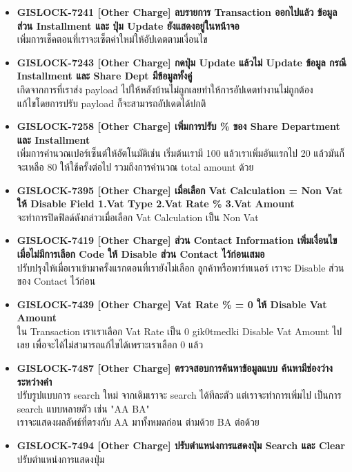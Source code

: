 \begin{itemize}
    \item \textbf{{GISLOCK-7241 [Other Charge] ลบรายการ Transaction ออกไปแล้ว ข้อมูลส่วน Installment และ ปุ่ม Update ยังแสดงอยู่ในหน้าจอ}} \\
        เพิ่มการเช็คตอนที่เราจะเซ็ตค่าใหม่ให้อัปเดตตามเงื่อนไข
    \item \textbf{{GISLOCK-7243 [Other Charge] กดปุ่ม Update แล้วไม่ Update ข้อมูล กรณี Installment และ Share Dept มีข้อมูลทั้งคู่}} \\
        เกิดจากการที่เราส่ง payload ไปให้หลังบ้านไม่ถูกเลยทำให้การอัปเดตทำงานไม่ถูกต้อง \\
        แก้ไขโดยการปรับ payload ก็จะสามารถอัปเดตได้ปกติ
    \item \textbf{{GISLOCK-7258 [Other Charge] เพิ่มการปรับ \% ของ Share Department และ Installment}} \\
        เพิ่มการคำนวณเปอร์เซ็นต์ให้อัตโนมัติเช่น เริ่มต้นเรามี 100 แล้วเราเพิ่มอันแรกไป 20 แล้วมันก็จะเหลือ 80 ให้ใช้ครั้งต่อไป รวมถึงการคำนวณ total amount ด้วย
    \item \textbf{{GISLOCK-7395 [Other Charge] เมื่อเลือก Vat Calculation = Non Vat ให้ Disable Field 1.Vat Type 2.Vat Rate \% 3.Vat Amount}} \\
        จะทำการปิดฟิลด์ดังกล่าวเมื่อเลือก Vat Calculation เป็น Non Vat
    \item \textbf{{GISLOCK-7419 [Other Charge] ส่วน Contact Information เพิ่มเงื่อนไขเมื่อไม่มีการเลือก Code ให้ Disable ส่วน Contact ไว้ก่อนเสมอ}} \\
        ปรับปรุงให้เมื่อเราเข้ามาครั้งแรกตอนที่เรายังไม่เลือก ลูกค้าหรือพาร์ทเนอร์ เราจะ Disable ส่วนของ Contact ไว้ก่อน
    \item \textbf{{GISLOCK-7439 [Other Charge] Vat Rate \% = 0 ให้ Disable Vat Amount}} \\
        ใน Transaction เราเราเลือก Vat Rate เป็น 0 gik0tmedki Disable Vat Amount ไปเลย เพื่อจะได้ไม่สามารถแก้ไขได้เพราะเราเลือก 0 แล้ว 
    \item \textbf{{GISLOCK-7487 [Other Charge] ตรวจสอบการค้นหาข้อมูลแบบ ค้นหามีช่องว่างระหว่างคำ}} \\
        ปรับรูปแบบการ search ใหม่ จากเดิมเราจะ search ได้ทีละตัว แต่เราจะทำการเพิ่มไป เป็นการ search แบบหลายตัว เช่น "AA BA" \\
        เราจะแสดงผลลัพธ์ที่ตรงกับ AA มาทั้งหมดก่อน ต่ามด้วย BA ต่อด้วย
    \item \textbf{{GISLOCK-7494 [Other Charge] ปรับตำแหน่งการแสดงปุ่ม Search และ Clear}} \\
        ปรับตำแหน่งการแสดงปุ่ม

\end{itemize}
